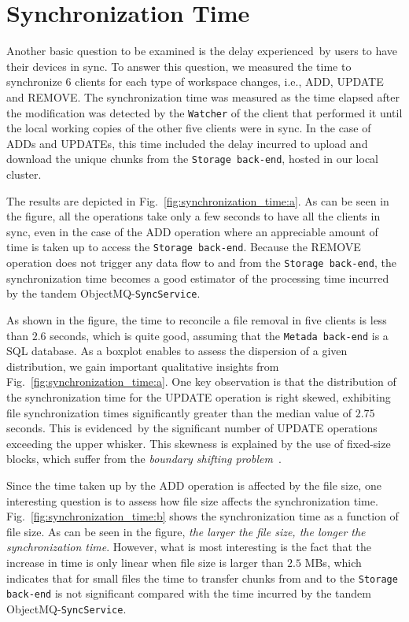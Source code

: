 \section{Synchronization Time}

Another basic question to be examined is the delay experienced~by users to have their devices in sync. 
To answer this question, we measured the time to synchronize $6$ clients for each type
of workspace changes, i.e., ADD, UPDATE and REMOVE. 
The synchronization time was measured as the time elapsed after the modification
was detected by the \texttt{Watcher} of the client that performed it until the local working copies of the other
five clients were in sync. In the case of ADDs and UPDATEs, this time included the delay incurred
to upload and download the unique chunks from the \texttt{Storage back-end}, hosted in our local cluster. 

The results are depicted in Fig.~\ref{fig:synchronization_time:a}. As can be seen in the figure, all the operations take
only a few seconds to have all the clients in sync, even in the case of the ADD operation where an appreciable
amount of time is taken up to access the \texttt{Storage back-end}. Because the REMOVE operation does not trigger any data flow to and from the
\texttt{Storage back-end}, the synchronization time becomes a good estimator of the processing time
incurred by the tandem ObjectMQ-\texttt{SyncService}. 

As shown in the figure, the time to reconcile
a file removal in five clients is less than $2.6$ seconds, which is quite good, assuming that the
\texttt{Metada back-end} is a SQL database.
As a boxplot enables to assess the dispersion of a given distribution, 
we gain important qualitative
insights from Fig.~\ref{fig:synchronization_time:a}. One key observation is that the distribution of the
synchronization time for the UPDATE operation is right skewed, exhibiting file synchronization times
significantly greater than the median value of $2.75$ seconds. This is evidenced~by
the significant number of UPDATE operations exceeding the upper whisker. This skewness is explained
by the use of fixed-size blocks, which suffer from the \textit{boundary shifting problem}~\cite{Eshghi05}.

Since the time taken up by the ADD operation is affected by the file size, one interesting question
is to assess how file size affects the synchronization time. Fig.~\ref{fig:synchronization_time:b} shows the synchronization
time as a function of file size. As can be seen in the figure, \textit{the larger the file size, the longer
the synchronization time}. However, what is most interesting is the fact that the increase in time
is only linear when file size is larger than $2.5$ MBs, which indicates that for small files the
time to transfer chunks from and to the \texttt{Storage back-end} is not significant compared
with the time incurred by the tandem ObjectMQ-\texttt{SyncService}. 


